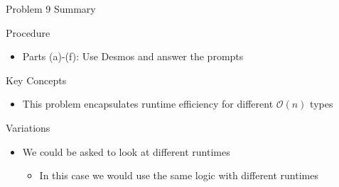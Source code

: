 \begin{summary}{Problem 9 Summary}
    \begin{statement}{Procedure}
        \begin{itemize}
            \item Parts (a)-(f): Use Desmos and answer the prompts
        \end{itemize}
    \end{statement}
    \begin{statement}{Key Concepts}
        \begin{itemize}
            \item This problem encapsulates runtime efficiency for different $\mathcal{O}(n)$ types
        \end{itemize}
    \end{statement}
    \begin{statement}{Variations}
        \begin{itemize}
            \item We could be asked to look at different runtimes
            \begin{itemize}
                \item In this case we would use the same logic with different runtimes
            \end{itemize}
        \end{itemize}
    \end{statement}
\end{summary}